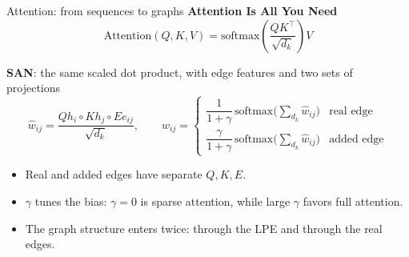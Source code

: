 \documentclass[aspectratio=169,11pt]{beamer}
\begin{document}
\begin{frame}{Attention: from sequences to graphs}
  \textbf{Attention Is All You Need}
  \begin{equation*}
    \mathrm{Attention}(Q,K,V) = \mathrm{softmax}\!\left(\frac{QK^\top}{\sqrt{d_k}}\right) V
  \end{equation*}

  \textbf{SAN}: the same scaled dot product, with edge features and two sets of
  projections
  \begin{equation*}
    \hat{w}_{ij} = \frac{Q h_i \circ K h_j \circ E e_{ij}}{\sqrt{d_k}},
    \qquad
    w_{ij} =
    \begin{cases}
      \dfrac{1}{1+\gamma}\,\mathrm{softmax}\big(\sum_{d_k} \hat{w}_{ij}\big) & \text{real edge}\\[2ex]
      \dfrac{\gamma}{1+\gamma}\,\mathrm{softmax}\big(\sum_{d_k} \hat{w}_{ij}\big) & \text{added edge}
    \end{cases}
  \end{equation*}

  \begin{itemize}
    \item Real and added edges have \alert{separate} $Q, K, E$.
    \item $\gamma$ tunes the bias: $\gamma = 0$ is sparse attention, while large
          $\gamma$ favors full attention.
    \item The graph structure enters twice: through the LPE and through the real
          edges.
  \end{itemize}
\end{frame}
\end{document}
